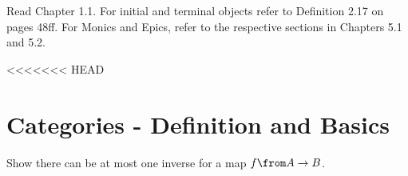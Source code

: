 \def\pathToRoot{../../}




\author{Sarah Mameche, Andreas Meyer, Leonhard Staut}

\begin{hint}
  Read Chapter 1.1. For initial and terminal objects refer to Definition 2.17 on pages 48ff. For Monics and Epics, refer to the respective sections in Chapters 5.1 and 5.2.
\end{hint}

<<<<<<< HEAD
%

\section{Categories - Definition and Basics}

\begin {exercise}
Show there can be at most one inverse for a map $f \from A \to B$.
\end{exercise}


